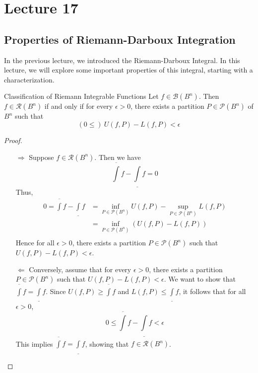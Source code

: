 \documentclass[../Analysis-3.tex]{subfiles}
\begin{document}
\chapter*{Lecture 17} %
\setcounter{chapter}{17} %
\setcounter{section}{0}

\section{Properties of Riemann-Darboux Integration}

In the previous lecture, we introduced the Riemann-Darboux Integral. In this lecture, we will explore some important properties of this integral, starting with a characterization.

\begin{Thm}{Classification of Riemann Integrable Functions}{}
  Let $ f \in \mathscr{B}(B^n) $. Then $ f \in \mathscr{R}(B^n) $ if and only if for every $ \epsilon > 0 $, there exists a partition $ P \in \mathscr{P}(B^n) $ of $ B^n $ such that
  \[  (0 \leq) \ U(f,P) - L(f,P) < \epsilon  \]
\end{Thm}

\begin{proof}
  \begin{itemize}
    \item[$ \Longrightarrow $] Suppose $f \in \mathscr{R}(B^n)$. Then we have
      \[  \overline{\int} f - \underline{\int} f = 0  \]
      Thus,
      \begin{align*}
        0 = \overline{\int} f - \underline{\int} f
         & = \inf_{P \in \mathscr{P}(B^n)} U(f,P) - \sup_{P \in \mathscr{P}(B^n)} L(f,P) \\
         & = \inf_{P \in \mathscr{P}(B^n)} (U(f,P) - L(f,P))                             \\
      \end{align*}
      Hence for all $\epsilon > 0$, there exists a partition $P \in \mathscr{P}(B^n)$ such that $U(f,P) - L(f,P) < \epsilon$.
    \item[$ \Longleftarrow $] Conversely, assume that for every $\epsilon > 0$, there exists a partition $P \in \mathscr{P}(B^n)$ such that $U(f,P) - L(f,P) < \epsilon$. We want to show that $\displaystyle\overline{\int} f = \underline{\int} f$. Since $\displaystyle U(f,P) \geq \overline{\int} f$ and $\displaystyle L(f,P) \leq \underline{\int} f$, it follows that for all $\epsilon > 0$,
      \[  0 \leq \overline{\int}f - \underline{\int}f < \epsilon  \]
      This implies $\displaystyle\overline{\int} f = \underline{\int} f$, showing that $f \in \mathscr{R}(B^n)$.
  \end{itemize}
\end{proof}
\end{document}
